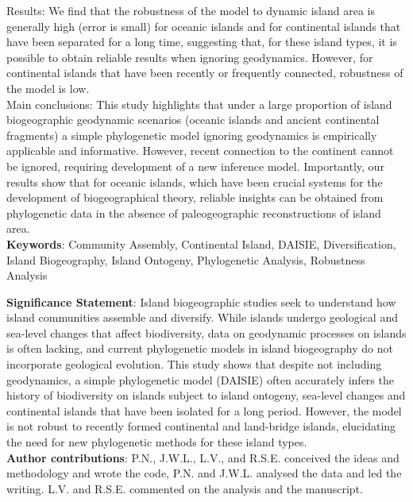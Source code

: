 \documentclass{article}
\begin{document}
\noindent Results: We find that the robustness of the model to dynamic island area is generally high (error is small) for oceanic islands and for continental islands that have been separated for a long time, suggesting that, for these island types, it is possible to obtain reliable results when ignoring geodynamics. However, for continental islands that have been recently or frequently connected, robustness of the model is low. \\

\noindent Main conclusions: This study highlights that under a large proportion of island biogeographic geodynamic scenarios (oceanic islands and ancient continental fragments) a simple phylogenetic model ignoring geodynamics is empirically applicable and informative. However, recent connection to the continent cannot be ignored, requiring development of a new inference model. Importantly, our results show that for oceanic islands, which have been crucial systems for the development of biogeographical theory, reliable insights can be obtained from phylogenetic data in the absence of paleogeographic reconstructions of island area. \\

\noindent \textbf{Keywords}: Community Assembly, Continental Island, DAISIE, Diversification, Island Biogeography, Island Ontogeny, Phylogenetic Analysis, Robustness Analysis \\

\clearpage

\noindent \textbf{Significance Statement}: Island biogeographic studies seek to understand how island communities assemble and diversify. While islands undergo geological and sea-level changes that affect biodiversity, data on geodynamic processes on islands is often lacking, and current phylogenetic models in island biogeography do not incorporate geological evolution. This study shows that despite not including geodynamics, a simple phylogenetic model (DAISIE) often accurately infers the history of biodiversity on islands subject to island ontogeny, sea-level changes and continental islands that have been isolated for a long period. However, the model is not robust to recently formed continental and land-bridge islands, elucidating the need for new phylogenetic methods for these island types. \\

\noindent \textbf{Author contributions}: P.N., J.W.L., L.V., and R.S.E. conceived the ideas and methodology and wrote the code, P.N. and J.W.L. analysed the data and led the writing. L.V. and R.S.E. commented on the analysis and the manuscript.\\
\end{document}
